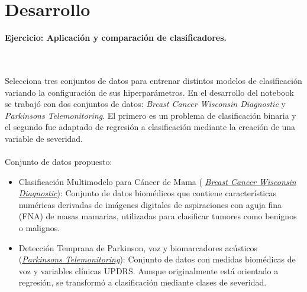 \documentclass{article}
\begin{document}
\section{Desarrollo}
\begin{large}
\textbf{Ejercicio: Aplicación y comparación de clasificadores.}
\end{large}
\\\\
Selecciona tres conjuntos de datos para entrenar distintos modelos de clasificación variando la configuración de sus hiperparámetros. En el desarrollo del notebook se trabajó con dos conjuntos de datos: \textit{Breast Cancer Wisconsin Diagnostic} y \textit{Parkinsons Telemonitoring}. El primero es un problema de clasificación binaria y el segundo fue adaptado de regresión a clasificación mediante la creación de una variable de severidad.
\\\\
Conjunto de datos propuesto:
\begin{itemize}
    \item Clasificación Multimodelo para Cáncer de Mama ( \href{https://archive.ics.uci.edu/dataset/17/breast+cancer+wisconsin+diagnostic}{\textit{Breast Cancer Wisconsin Diagnostic}}): Conjunto de datos biomédicos que contiene características numéricas derivadas de imágenes digitales de aspiraciones con aguja fina (FNA) de masas mamarias, utilizadas para clasificar tumores como benignos o malignos.
    \item Detección Temprana de Parkinson, voz y biomarcadores acústicos (\href{https://archive.ics.uci.edu/dataset/189/parkinsons+telemonitoring}{\textit{Parkinsons Telemonitoring}}): Conjunto de datos con medidas biomédicas de voz y variables clínicas UPDRS. Aunque originalmente está orientado a regresión, se transformó a clasificación mediante clases de severidad.
\end{itemize}
\end{document}

